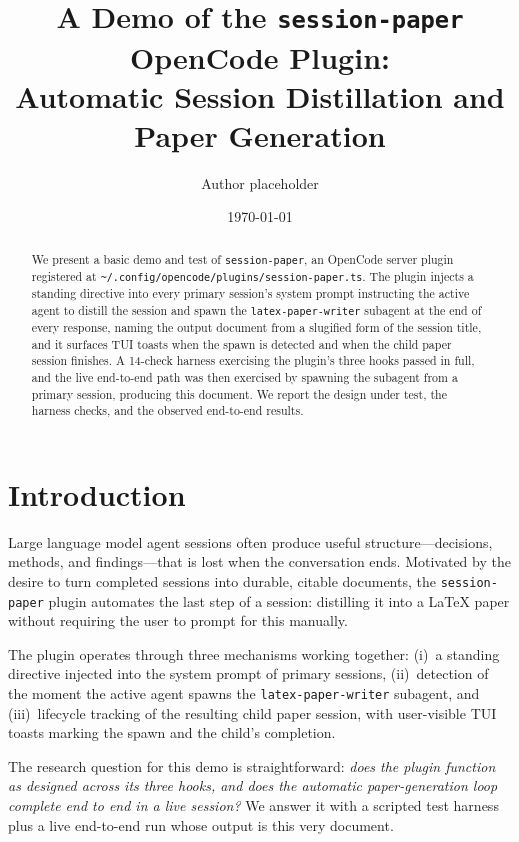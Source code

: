\documentclass[11pt]{article}
\title{A Demo of the \texttt{session-paper} OpenCode Plugin:\\ Automatic Session Distillation and Paper Generation}
\author{Author placeholder} %
\date{\today}
\begin{document}
\maketitle

\begin{abstract}
We present a basic demo and test of \texttt{session-paper}, an OpenCode server plugin
registered at \texttt{\textasciitilde/.config/opencode/plugins/session-paper.ts}. The plugin
injects a standing directive into every primary session's system prompt instructing the
active agent to distill the session and spawn the \texttt{latex-paper-writer} subagent at
the end of every response, naming the output document from a slugified form of the session
title, and it surfaces TUI toasts when the spawn is detected and when the child paper
session finishes. A 14-check harness exercising the plugin's three hooks passed in full,
and the live end-to-end path was then exercised by spawning the subagent from a primary
session, producing this document. We report the design under test, the harness checks, and
the observed end-to-end results.
\end{abstract}

\section{Introduction}
\label{sec:intro}

Large language model agent sessions often produce useful structure---decisions, methods,
and findings---that is lost when the conversation ends. Motivated by the desire to turn
completed sessions into durable, citable documents, the \texttt{session-paper} plugin
automates the last step of a session: distilling it into a LaTeX paper without requiring
the user to prompt for this manually.

The plugin operates through three mechanisms working together: (i)~a standing directive
injected into the system prompt of primary sessions, (ii)~detection of the moment the
active agent spawns the \texttt{latex-paper-writer} subagent, and (iii)~lifecycle tracking
of the resulting child paper session, with user-visible TUI toasts marking the spawn and
the child's completion.

The research question for this demo is straightforward: \emph{does the plugin function as
designed across its three hooks, and does the automatic paper-generation loop complete end
to end in a live session?} We answer it with a scripted test harness plus a live
end-to-end run whose output is this very document.
\end{document}
